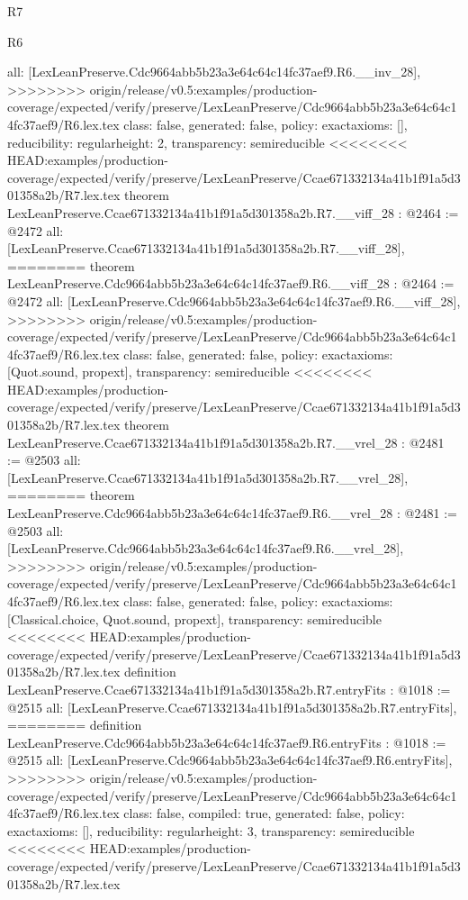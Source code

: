 \begin{lexlean}{R7}
\begin{lexlean}{R6}
\begin{coremodule}
{{{{{{{{{{{{  all: [LexLeanPreserve.Cdc9664abb5b23a3e64c64c14fc37aef9.R6.__inv_28],
>>>>>>>> origin/release/v0.5:examples/production-coverage/expected/verify/preserve/LexLeanPreserve/Cdc9664abb5b23a3e64c64c14fc37aef9/R6.lex.tex
  class: false,
  generated: false,
  policy: exact{axioms: []},
  reducibility: regular{height: 2},
  transparency: semireducible
}
<<<<<<<< HEAD:examples/production-coverage/expected/verify/preserve/LexLeanPreserve/Ccae671332134a41b1f91a5d301358a2b/R7.lex.tex
theorem LexLeanPreserve.Ccae671332134a41b1f91a5d301358a2b.R7.__viff_28 : @2464 := @2472 {
  all: [LexLeanPreserve.Ccae671332134a41b1f91a5d301358a2b.R7.__viff_28],
========
theorem LexLeanPreserve.Cdc9664abb5b23a3e64c64c14fc37aef9.R6.__viff_28 : @2464 := @2472 {
  all: [LexLeanPreserve.Cdc9664abb5b23a3e64c64c14fc37aef9.R6.__viff_28],
>>>>>>>> origin/release/v0.5:examples/production-coverage/expected/verify/preserve/LexLeanPreserve/Cdc9664abb5b23a3e64c64c14fc37aef9/R6.lex.tex
  class: false,
  generated: false,
  policy: exact{axioms: [Quot.sound, propext]},
  transparency: semireducible
}
<<<<<<<< HEAD:examples/production-coverage/expected/verify/preserve/LexLeanPreserve/Ccae671332134a41b1f91a5d301358a2b/R7.lex.tex
theorem LexLeanPreserve.Ccae671332134a41b1f91a5d301358a2b.R7.__vrel_28 : @2481 := @2503 {
  all: [LexLeanPreserve.Ccae671332134a41b1f91a5d301358a2b.R7.__vrel_28],
========
theorem LexLeanPreserve.Cdc9664abb5b23a3e64c64c14fc37aef9.R6.__vrel_28 : @2481 := @2503 {
  all: [LexLeanPreserve.Cdc9664abb5b23a3e64c64c14fc37aef9.R6.__vrel_28],
>>>>>>>> origin/release/v0.5:examples/production-coverage/expected/verify/preserve/LexLeanPreserve/Cdc9664abb5b23a3e64c64c14fc37aef9/R6.lex.tex
  class: false,
  generated: false,
  policy: exact{axioms: [Classical.choice, Quot.sound, propext]},
  transparency: semireducible
}
<<<<<<<< HEAD:examples/production-coverage/expected/verify/preserve/LexLeanPreserve/Ccae671332134a41b1f91a5d301358a2b/R7.lex.tex
definition LexLeanPreserve.Ccae671332134a41b1f91a5d301358a2b.R7.entryFits : @1018 := @2515 {
  all: [LexLeanPreserve.Ccae671332134a41b1f91a5d301358a2b.R7.entryFits],
========
definition LexLeanPreserve.Cdc9664abb5b23a3e64c64c14fc37aef9.R6.entryFits : @1018 := @2515 {
  all: [LexLeanPreserve.Cdc9664abb5b23a3e64c64c14fc37aef9.R6.entryFits],
>>>>>>>> origin/release/v0.5:examples/production-coverage/expected/verify/preserve/LexLeanPreserve/Cdc9664abb5b23a3e64c64c14fc37aef9/R6.lex.tex
  class: false,
  compiled: true,
  generated: false,
  policy: exact{axioms: []},
  reducibility: regular{height: 3},
  transparency: semireducible
}
<<<<<<<< HEAD:examples/production-coverage/expected/verify/preserve/LexLeanPreserve/Ccae671332134a41b1f91a5d301358a2b/R7.lex.tex
}}}}}}}}}}}}}}
\end{coremodule}
\end{lexlean}
\end{lexlean}
